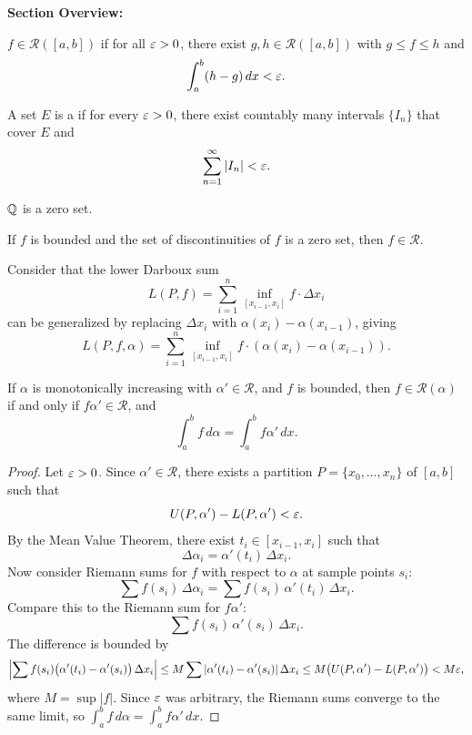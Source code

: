 \documentclass[../master/master.tex]{subfiles}
\begin{document}
\begin{summarybox}
\textbf{Section Overview:}
\end{summarybox}

\begin{theorem}
$f \in \mathscr{R}([a,b])$ if for all $\varepsilon > 0$, there exist $g, h \in \mathscr{R}([a,b])$ with $g \leq f \leq h$ and
\[
\int_a^b (h - g)\,dx < \varepsilon.
\]
\end{theorem}

\begin{definition}
A set $E$ is a  if for every $\varepsilon > 0$, there exist countably many intervals $\{I_n\}$ that cover $E$ and
\[
\sum_{n=1}^{\infty} |I_n| < \varepsilon.
\]
\end{definition}

\begin{example}
$\mathbb{Q}$ is a zero set.
\end{example}

\begin{theorem}
If $f$ is bounded and the set of discontinuities of $f$ is a zero set, then $f \in \mathscr{R}$.
\end{theorem}

Consider that the lower Darboux sum
\[
L(P, f) = \sum_{i=1}^{n} \inf_{[x_{i-1}, x_i]} f \cdot \Delta x_i
\]
can be generalized by replacing $\Delta x_i$ with $\alpha(x_i) - \alpha(x_{i-1})$, giving
\[
L(P, f, \alpha) = \sum_{i=1}^{n} \inf_{[x_{i-1}, x_i]} f \cdot (\alpha(x_i) - \alpha(x_{i-1})).
\]

\begin{theorem}
If $\alpha$ is monotonically increasing with $\alpha' \in \mathscr{R}$, and $f$ is bounded, then $f \in \mathscr{R}(\alpha)$ if and only if $f\alpha' \in \mathscr{R}$, and
\[
\int_a^b f\,d\alpha = \int_a^b f\alpha'\,dx.
\]
\end{theorem}

\begin{proof}
Let $\varepsilon > 0$. Since $\alpha' \in \mathscr{R}$, there exists a partition $P = \{x_0, \ldots, x_n\}$ of $[a,b]$ such that
\[
U(P, \alpha') - L(P, \alpha') < \varepsilon.
\]
By the Mean Value Theorem, there exist $t_i \in [x_{i-1}, x_i]$ such that
\[
\Delta \alpha_i = \alpha'(t_i)\,\Delta x_i.
\]
Now consider Riemann sums for $f$ with respect to $\alpha$ at sample points $s_i$:
\[
\sum f(s_i)\,\Delta\alpha_i = \sum f(s_i)\,\alpha'(t_i)\,\Delta x_i.
\]
Compare this to the Riemann sum for $f\alpha'$:
\[
\sum f(s_i)\,\alpha'(s_i)\,\Delta x_i.
\]
The difference is bounded by
\[
\left|\sum f(s_i)\bigl(\alpha'(t_i) - \alpha'(s_i)\bigr)\,\Delta x_i\right| \leq M \sum |\alpha'(t_i) - \alpha'(s_i)|\,\Delta x_i \leq M\bigl(U(P,\alpha') - L(P,\alpha')\bigr) < M\varepsilon,
\]
where $M = \sup|f|$. Since $\varepsilon$ was arbitrary, the Riemann sums converge to the same limit, so $\int_a^b f\,d\alpha = \int_a^b f\alpha'\,dx$.
\end{proof}
\end{document}
